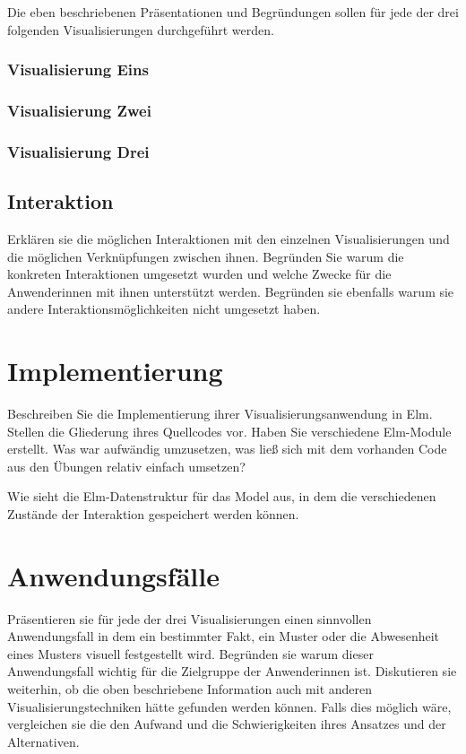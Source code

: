 \documentclass[usegeometry=true]{scrartcl}
\begin{document}
Die eben beschriebenen Präsentationen und Begründungen sollen für jede der drei folgenden Visualisierungen durchgeführt werden. 
\subsubsection{Visualisierung Eins}
\subsubsection{Visualisierung Zwei}
\subsubsection{Visualisierung Drei}

\subsection{Interaktion}
Erklären sie die möglichen Interaktionen mit den einzelnen Visualisierungen und die möglichen Verknüpfungen zwischen ihnen. Begründen Sie warum die konkreten Interaktionen umgesetzt wurden und welche Zwecke für die Anwenderinnen mit ihnen unterstützt werden. Begründen sie ebenfalls warum sie andere Interaktionsmöglichkeiten nicht umgesetzt haben. 

\section{Implementierung}
Beschreiben Sie die Implementierung ihrer Visualisierungsanwendung in Elm. Stellen die Gliederung ihres Quellcodes vor. Haben Sie verschiedene Elm-Module erstellt. Was war aufwändig umzusetzen, was ließ sich mit dem vorhanden Code aus den Übungen relativ einfach umsetzen? 

Wie sieht die Elm-Datenstruktur für das Model aus, in dem die verschiedenen Zustände der Interaktion gespeichert werden können.

\section{Anwendungsfälle}
Präsentieren sie für jede der drei Visualisierungen einen sinnvollen Anwendungsfall in dem ein bestimmter Fakt, ein Muster oder die Abwesenheit eines Musters visuell festgestellt wird. Begründen sie warum dieser Anwendungsfall wichtig für die Zielgruppe der Anwenderinnen ist. Diskutieren sie weiterhin, ob die oben beschriebene Information auch mit anderen Visualisierungstechniken hätte gefunden werden können. Falls dies möglich wäre, vergleichen sie die den Aufwand und die Schwierigkeiten ihres Ansatzes und der Alternativen. 
\end{document}
